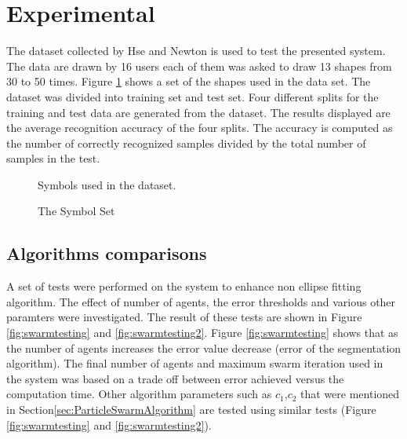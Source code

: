 \documentclass{article}
\begin{document}
\section{Experimental}
\label{sec:Experiments}
The dataset collected by Hse and Newton\cite{HeloiseBeautification} is used to test the presented system. The data are drawn by 16 users each of them was asked to draw 13 shapes from 30 to 50 times. Figure \ref{fig:symbolSet} shows a set of the shapes used in the data set. The dataset was divided into training set and test set. Four different splits for the training and test data are generated from the dataset. The results displayed are the average recognition accuracy of the four splits. The accuracy is computed as the number of correctly recognized samples divided by the total number of samples in the test. %
\begin{figure}
\centering 
\label{fig:symbolSet}
		\caption{The Symbol Set} Symbols used in the dataset.
\end{figure}
\subsection{Algorithms comparisons}
\label{sec:AlgExp}
A set of tests were performed on the system to enhance non ellipse fitting algorithm. The effect of number of agents, the error thresholds and various other paramters were investigated. The result of these tests are shown in Figure \ref{fig:swarmtesting} and   \ref{fig:swarmtesting2}. Figure \ref{fig:swarmtesting} shows that as the number of agents increases the error value decrease (error of the segmentation algorithm). The final number of agents and maximum swarm iteration used in the system was based on a trade off between error achieved versus the computation time. Other algorithm parameters such as $c_1$,$c_2$ that were mentioned in Section\ref{sec:ParticleSwarmAlgorithm} are tested using similar tests (Figure \ref{fig:swarmtesting} and \ref{fig:swarmtesting2}).
    
\end{document}
